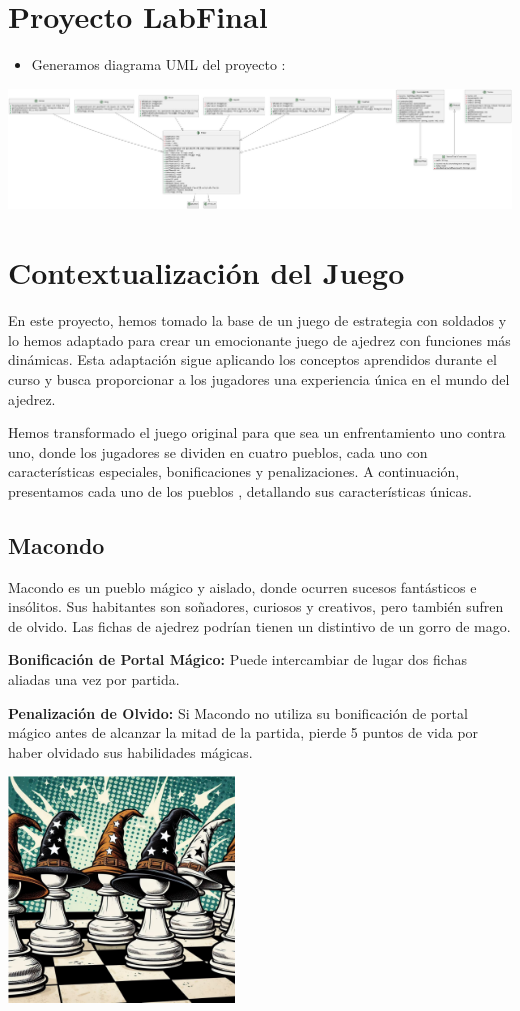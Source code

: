 \documentclass{article}
\begin{document}
\section{Proyecto LabFinal}
 

            \begin{itemize}
                \item Generamos diagrama UML del proyecto :
            \end{itemize}
            \includegraphics[width=18cm]{latex/img/uml.png}
\section{Contextualización del Juego}

En este proyecto, hemos tomado la base de un juego de estrategia con soldados y lo hemos adaptado para crear un emocionante juego de ajedrez con funciones más dinámicas. Esta adaptación sigue aplicando los conceptos aprendidos durante el curso y busca proporcionar a los jugadores una experiencia única en el mundo del ajedrez.

Hemos transformado el juego original para que sea un enfrentamiento uno contra uno, donde los jugadores se dividen en cuatro pueblos, cada uno con características especiales, bonificaciones y penalizaciones. A continuación, presentamos cada uno de los pueblos , detallando sus características únicas.

\subsection{Macondo}
Macondo es un pueblo mágico y aislado, donde ocurren sucesos fantásticos e insólitos. Sus habitantes son soñadores, curiosos y creativos, pero también sufren de olvido. Las fichas de ajedrez podrían tienen un distintivo de un gorro de mago.

\textbf{Bonificación de Portal Mágico:}
Puede intercambiar de lugar dos fichas aliadas una vez por partida.

\textbf{Penalización de Olvido:}
Si Macondo no utiliza su bonificación de portal mágico antes de alcanzar la mitad de la partida, pierde 5 puntos de vida por haber olvidado sus habilidades mágicas.
\begin{center}
    \includegraphics[width=6cm]{latex/img/Macondo.png}
\end{center}
\end{document}
